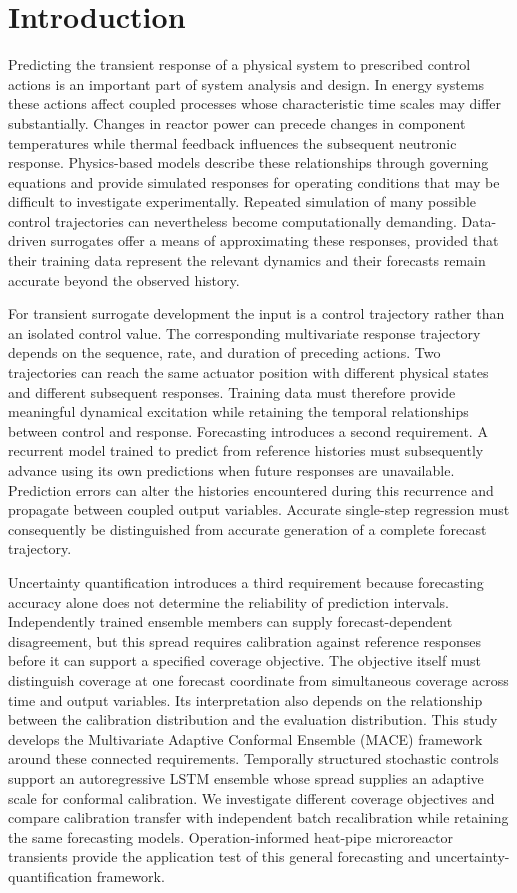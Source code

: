 \section{Introduction}
\label{sec:intro}

Predicting the transient response of a physical system to prescribed control actions is an important part of system analysis and design. In energy systems these actions affect coupled processes whose characteristic time scales may differ substantially. Changes in reactor power can precede changes in component temperatures while thermal feedback influences the subsequent neutronic response. Physics-based models describe these relationships through governing equations and provide simulated responses for operating conditions that may be difficult to investigate experimentally. Repeated simulation of many possible control trajectories can nevertheless become computationally demanding. Data-driven surrogates offer a means of approximating these responses, provided that their training data represent the relevant dynamics and their forecasts remain accurate beyond the observed history.

For transient surrogate development the input is a control trajectory rather than an isolated control value. The corresponding multivariate response trajectory depends on the sequence, rate, and duration of preceding actions. Two trajectories can reach the same actuator position with different physical states and different subsequent responses. Training data must therefore provide meaningful dynamical excitation while retaining the temporal relationships between control and response. Forecasting introduces a second requirement. A recurrent model trained to predict from reference histories must subsequently advance using its own predictions when future responses are unavailable. Prediction errors can alter the histories encountered during this recurrence and propagate between coupled output variables. Accurate single-step regression must consequently be distinguished from accurate generation of a complete forecast trajectory.

Uncertainty quantification introduces a third requirement because forecasting accuracy alone does not determine the reliability of prediction intervals. Independently trained ensemble members can supply forecast-dependent disagreement, but this spread requires calibration against reference responses before it can support a specified coverage objective. The objective itself must distinguish coverage at one forecast coordinate from simultaneous coverage across time and output variables. Its interpretation also depends on the relationship between the calibration distribution and the evaluation distribution. This study develops the Multivariate Adaptive Conformal Ensemble (MACE) framework around these connected requirements. Temporally structured stochastic controls support an autoregressive LSTM ensemble whose spread supplies an adaptive scale for conformal calibration. We investigate different coverage objectives and compare calibration transfer with independent batch recalibration while retaining the same forecasting models. Operation-informed heat-pipe microreactor transients provide the application test of this general forecasting and uncertainty-quantification framework.

